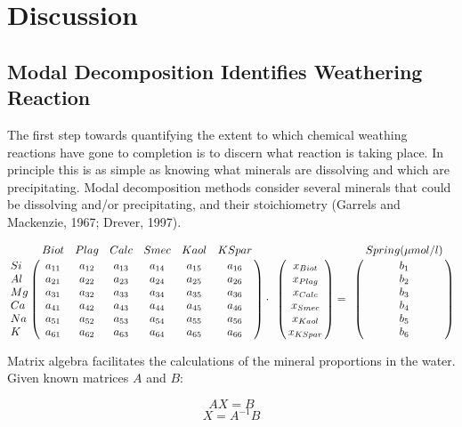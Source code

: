 

\section{Discussion}

\subsection{Modal Decomposition Identifies Weathering Reaction}

The first step towards quantifying the extent to which chemical weathing reactions have gone to completion is to discern what reaction is taking place. In principle this is as simple as knowing what minerals are dissolving and which are precipitating. Modal decomposition methods consider several minerals that could be dissolving and/or precipitating, and their stoichiometry (Garrels and Mackenzie, 1967; Drever, 1997).


\begin{center}
\[
  \begin{bordermatrix}
{ & Biot & Plag & Calc & Smec & Kaol & KSpar \cr
Si  & a_{11}  & a_{12}  & a_{13}  & a_{14}  & a_{15}  & a_{16}  \cr
Al  & a_{21}  & a_{22}  & a_{23}  & a_{24}  & a_{25}  & a_{26}  \cr
Mg  & a_{31}  & a_{32}  & a_{33}  & a_{34}  & a_{35}  & a_{36}  \cr
Ca  & a_{41}  & a_{42}  & a_{43}  & a_{44}  & a_{45}  & a_{46}  \cr
Na  & a_{51}  & a_{52}  & a_{53}  & a_{54}  & a_{55}  & a_{56}  \cr
K   & a_{61}  & a_{62}  & a_{63}  & a_{64}  & a_{65}  & a_{66}  \cr}
  \end{bordermatrix}
  \cdot
  \begin{bordermatrix}
{ &  \cr
  & x_{Biot} \cr
  & x_{Plag} \cr
  & x_{Calc} \cr
  & x_{Smec} \cr
  & x_{Kaol} \cr
  & x_{KSpar} \cr}
  \end{bordermatrix}
  =
  \begin{bordermatrix}
{ & Spring (\mu mol/l) \cr
  & b_1 \cr
  & b_2 \cr
  & b_3 \cr
  & b_4 \cr
  & b_5 \cr
  & b_6 \cr}
  \end{bordermatrix}
\]
\end{center}
\bsk

Matrix algebra facilitates the calculations of the mineral proportions in the water. Given known matrices \( A \) and \( B \):

\begin{equation}
AX = B
\end{equation}
\begin{equation}
X = A^{-1}B
\end{equation}\\

